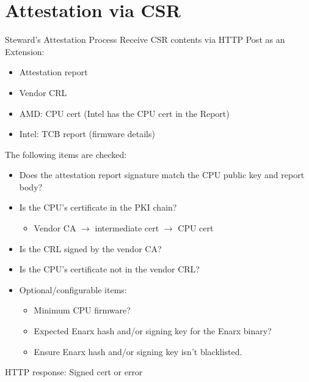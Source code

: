 \documentclass[graphics]{beamer}
\begin{document}
\section{Attestation via CSR}
\begin{frame}{Steward's Attestation Process}
Receive CSR contents via HTTP Post as an Extension:
\begin{itemize}
    \item Attestation report
    \item Vendor CRL
    \item AMD: CPU cert (Intel has the CPU cert in the Report)
    \item Intel: TCB report (firmware details)
\end{itemize}

The following items are checked:
\begin{itemize}
    \item Does the attestation report signature match the CPU public key and report body?
    \item Is the CPU's certificate in the PKI chain?
    \begin{itemize}
        \item Vendor CA $\rightarrow$ intermediate cert $\rightarrow$ CPU cert
    \end{itemize}
    \item Is the CRL signed by the vendor CA?
    \item Is the CPU's certificate not in the vendor CRL?
    \item Optional/configurable items:
    \begin{itemize}
        \item Minimum CPU firmware?
        \item Expected Enarx hash and/or signing key for the Enarx binary?
        \item Ensure Enarx hash and/or signing key isn't blacklisted.
    \end{itemize}
\end{itemize}

HTTP response: Signed cert or error
\end{frame}
\end{document}
